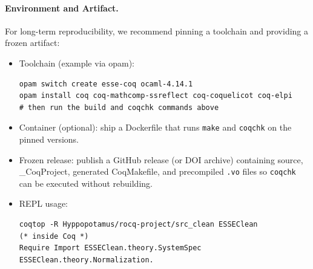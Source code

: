 \documentclass[10pt]{article}
\begin{document}
\paragraph{Environment and Artifact.}
For long-term reproducibility, we recommend pinning a toolchain and providing a frozen artifact:
\begin{itemize}
  \item Toolchain (example via opam):
\begin{verbatim}
opam switch create esse-coq ocaml-4.14.1
opam install coq coq-mathcomp-ssreflect coq-coquelicot coq-elpi
# then run the build and coqchk commands above
\end{verbatim}
  \item Container (optional): ship a Dockerfile that runs \verb|make| and \verb|coqchk| on the pinned versions.
  \item Frozen release: publish a GitHub release (or DOI archive) containing source, _CoqProject, generated CoqMakefile, and precompiled \verb|.vo| files so \verb|coqchk| can be executed without rebuilding.
  \item REPL usage: 
\begin{verbatim}
coqtop -R Hyppopotamus/rocq-project/src_clean ESSEClean
(* inside Coq *)
Require Import ESSEClean.theory.SystemSpec ESSEClean.theory.Normalization.
\end{verbatim}
\end{itemize}
\end{document}
